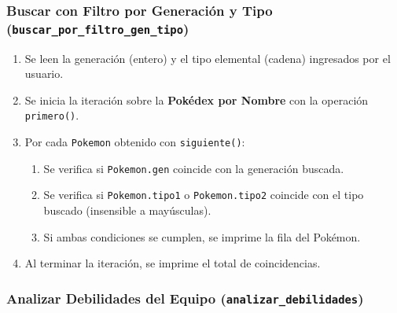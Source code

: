\documentclass[12pt, letterpaper]{article}
\begin{document}
\subsubsection{Buscar con Filtro por Generación y Tipo (\texttt{buscar\_por\_filtro\_gen\_tipo})}

\begin{enumerate}
    \item Se leen la generación (entero) y el tipo elemental (cadena) ingresados por el usuario.
    \item Se inicia la iteración sobre la \textbf{Pokédex por Nombre} con la operación \texttt{primero()}.
    \item Por cada \texttt{Pokemon} obtenido con \texttt{siguiente()}:
    \begin{enumerate}
        \item Se verifica si \texttt{Pokemon.gen} coincide con la generación buscada.
        \item Se verifica si \texttt{Pokemon.tipo1} o \texttt{Pokemon.tipo2} coincide con el tipo buscado (insensible a mayúsculas).
        \item Si ambas condiciones se cumplen, se imprime la fila del Pokémon.
    \end{enumerate}
    \item Al terminar la iteración, se imprime el total de coincidencias.
\end{enumerate}

\subsubsection{Analizar Debilidades del Equipo (\texttt{analizar\_debilidades})}
\end{document}
